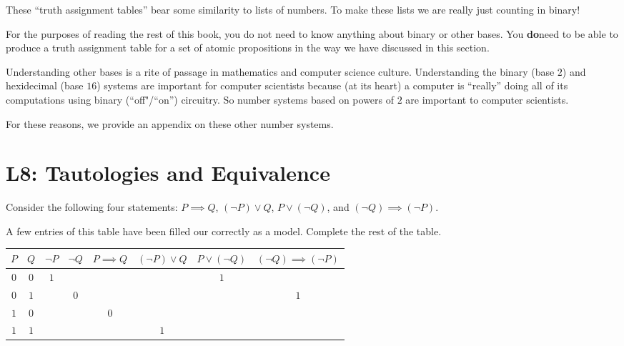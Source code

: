These ``truth assignment tables'' bear some similarity to lists of numbers. To make these lists we are really just counting in binary!

For the purposes of reading the rest of this book, you do not need to know anything about binary or other bases.  You \textbf{do}need to be able to produce a truth assignment table for a set of atomic propositions in the way we have discussed in this section.

Understanding other bases is a rite of passage in mathematics and computer science culture.  Understanding the binary (base $2$)  and hexidecimal (base $16$) systems are important for computer scientists because (at its heart) a computer is ``really'' doing all of its computations using binary (``off"/``on'') circuitry.  So number systems based on powers of $2$ are important to computer scientists.

For these reasons, we provide an appendix on these other number systems.

\section{L8:  Tautologies and Equivalence}

\begin{xca}
	Consider the following four statements:  $P \implies Q$,  $(\neg P) \vee Q$, $P \vee (\neg Q)$, and $(\neg Q) \implies (\neg P)$. 
	
	A few entries of this table have been filled our correctly as a model.  Complete the rest of the table.
	
	\begin{table}[h!]
		\begin{center}
			\begin{tabular}{c|c|c|c|c|c|c|c} 
				$P$ & $Q$ & $\neg P$ & $\neg Q$  & $P \implies Q$ & $(\neg P) \vee Q$ &  $P \vee (\neg Q)$ & $(\neg Q) \implies (\neg P)$ \\
				\hline
				$0$& $0$ & $1$ &         &          &            &  $1$   &   \\ \hline
				$0$& $1$ &         & $0$ &          &            &            &  $1$  \\ \hline
				$1$& $0$ &         &         &  $0$ &            &            &     \\ \hline
				$1$& $1$ &         &         &          &  $1$   &            &      \\ 
			\end{tabular}
		\end{center}
	\end{table}
	
\end{xca}

